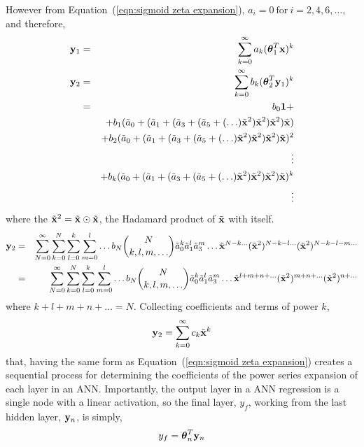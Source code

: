 However from Equation~(\ref{eqn:sigmoid zeta expansion}), $a_i  = 0\ \text{for}\ i = 2, 4, 6, \ldots$, and therefore,
\begin{eqnarray}
	{\bold y}_1 & = & \sum_{k=0}^\infty a_k (\boldsymbol\theta_1^T {\bold x})^k \nonumber \\
	{\bold y}_2 & = & \sum_{k=0}^\infty b_k (\boldsymbol\theta_2^T {\bold y}_1)^k \nonumber \\
		& = & b_0 {\bold 1} + \nonumber\\
		&   & + b_1 (\tilde a_0 +%
					(\tilde a_1 + %
						(\tilde a_3 + %
							(\tilde a_5 + %
								(\ldots) \tilde {\bold x}^2 )%
							\tilde {\bold x}^2 )%
						\tilde {\bold x}^2 )%
					\tilde {\bold x}) \nonumber \\
		&   & + b_2 (\tilde a_0 +%
					(\tilde a_1 + %
						(\tilde a_3 + %
							(\tilde a_5 + %
								(\ldots) \tilde {\bold x}^2 )%
							\tilde {\bold x}^2 )%
						\tilde {\bold x}^2 )%
					\tilde {\bold x})^2 \nonumber \\
		&   & \vdots \nonumber \\
		&   & + b_k (\tilde a_0 +%
					(\tilde a_1 + %
						(\tilde a_3 + %
							(\tilde a_5 + %
								(\ldots) \tilde {\bold x}^2 )%
							\tilde {\bold x}^2 )%
						\tilde {\bold x}^2 )%
					\tilde {\bold x})^k \nonumber \\
		&   & \vdots
\end{eqnarray}
\noindent where the $\tilde{\bold x}^2 = \tilde{\bold x} \odot \tilde{\bold x}$, the Hadamard product of $\tilde{\bold x}$ with itself.
\begin{eqnarray}
	{\bold y}_2 & = & \sum_{N=0}^\infty \sum_{k=0}^{N} \sum_{l=0}^{k} \sum_{m=0}^{l} \ldots %
		b_N %
		\binom{N}{k,l,m,\ldots} %
		\tilde a_0^k \tilde a_1^l \tilde a_3^m \ldots %
		\tilde {\bold x}^{N-k\ldots} %
		({\tilde {\bold x}^2})^{N-k-l\ldots} %
		({\tilde {\bold x}^2})^{N-k-l-m\ldots} \nonumber \\
	& = & \sum_{N=0}^\infty \sum_{k=0}^{N} \sum_{l=0}^{k} \sum_{m=0}^{l} \ldots %
		b_N %
		\binom{N}{k,l,m,\ldots} %
		\tilde a_0^k \tilde a_1^l \tilde a_3^m \ldots %
		\tilde {\bold x}^{l+m+n+\ldots} %
		({\tilde {\bold x}^2})^{m+n+\ldots} %
		({\tilde {\bold x}^2})^{n+\ldots}
	\label{eqn:ANN power series coefficient generating function}
\end{eqnarray}
\noindent where $k+l+m+n+\ldots = N$. Collecting coefficients and terms of power $k$,
\begin{equation*}
	{\bold y_2} =  \sum_{k=0}^\infty c_k \tilde{\bold x}^k
\end{equation*}
\noindent that, having the same form as Equation~(\ref{eqn:sigmoid zeta expansion}) creates a sequential process for determining the coefficients of the power series expansion of each layer in an ANN. Importantly, the output layer in a ANN regression is a single node with a linear activation, so the final layer, $y_f$, working from the last hidden layer, ${\bold y}_n$, is simply,
\begin{equation}
	y_f = \boldsymbol\theta_n^T {\bold y}_n
\end{equation}

